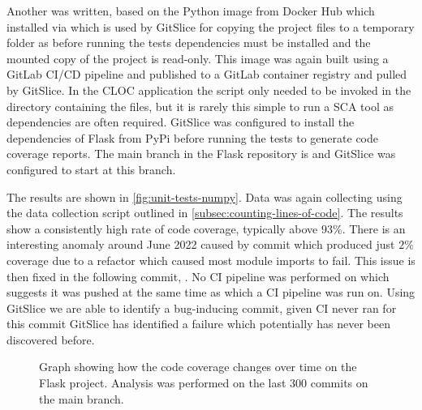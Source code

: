 Another  was written, based on the Python image from Docker Hub which installed  via  which is used by GitSlice for copying the project files to a temporary folder as before running the tests dependencies must be installed and the mounted copy of the project is read-only.
This image was again built using a GitLab CI/CD pipeline and published to a GitLab container registry and pulled by GitSlice.
In the CLOC application the script only needed to be invoked in the directory containing the files, but it is rarely this simple to run a SCA tool as dependencies are often required.
GitSlice was configured to install the dependencies of Flask from PyPi before running the tests to generate code coverage reports.
The main branch in the Flask repository is  and GitSlice was configured to start at this branch.

The results are shown in \autoref{fig:unit-tests-numpy}.
Data was again collecting using the data collection script outlined in \autoref{subsec:counting-lines-of-code}.
The results show a consistently high rate of code coverage, typically above $ 93 $\%.
There is an interesting anomaly around June 2022 caused by commit  which produced just $ 2\% $ coverage due to a refactor which caused most module imports to fail.
This issue is then fixed in the following commit, .
No CI pipeline was performed on  which suggests it was pushed at the same time as  which a CI pipeline was run on.
Using GitSlice we are able to identify a bug-inducing commit, given CI never ran for this commit GitSlice has identified a failure which potentially has never been discovered before.

\begin{figure}
    \centering
    \caption{Graph showing how the code coverage changes over time on the Flask project.  Analysis was performed on the last $300$ commits on the main branch.}
    \label{fig:unit-tests-numpy}
\end{figure}

